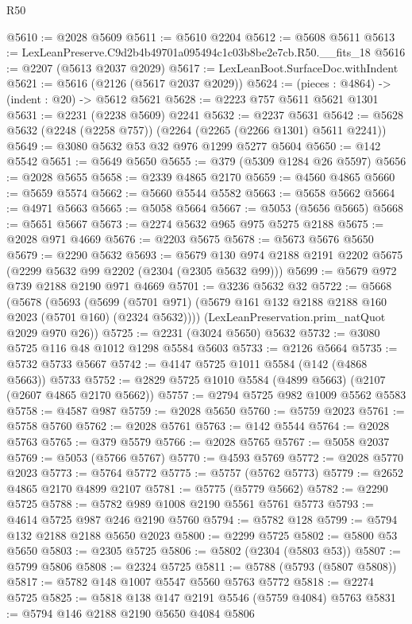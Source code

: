 \begin{lexlean}{R50}
\begin{coremodule}
@5610 := @2028 @5609
@5611 := @5610 @2204
@5612 := @5608 @5611
@5613 := LexLeanPreserve.C9d2b4b49701a095494c1c03b8be2e7cb.R50.__fits_18
@5616 := @2207 (@5613 @2037 @2029)
@5617 := LexLeanBoot.SurfaceDoc.withIndent
@5621 := @5616 (@2126 (@5617 @2037 @2029))
@5624 := (pieces : @4864) -> (indent : @20) -> @5612 @5621
@5628 := @2223 @757 @5611 @5621 @1301
@5631 := @2231 (@2238 @5609) @2241
@5632 := @2237 @5631
@5642 := @5628 @5632 (@2248 (@2258 @757)) (@2264 (@2265 (@2266 @1301) @5611 @2241))
@5649 := @3080 @5632 @53 @32 @976 @1299 @5277 @5604
@5650 := @142 @5542
@5651 := @5649 @5650
@5655 := @379 (@5309 @1284 @26 @5597)
@5656 := @2028 @5655
@5658 := @2339 @4865 @2170
@5659 := @4560 @4865
@5660 := @5659 @5574
@5662 := @5660 @5544 @5582
@5663 := @5658 @5662
@5664 := @4971 @5663
@5665 := @5058 @5664
@5667 := @5053 (@5656 @5665)
@5668 := @5651 @5667
@5673 := @2274 @5632 @965 @975 @5275 @2188
@5675 := @2028 @971 @4669
@5676 := @2203 @5675
@5678 := @5673 @5676 @5650
@5679 := @2290 @5632
@5693 := @5679 @130 @974 @2188 @2191 @2202 @5675 (@2299 @5632 @99 @2202 (@2304 (@2305 @5632 @99)))
@5699 := @5679 @972 @739 @2188 @2190 @971 @4669
@5701 := @3236 @5632 @32
@5722 := @5668
    (@5678
      (@5693
        (@5699 (@5701 @971) (@5679 @161 @132 @2188 @2188 @160 @2023 (@5701 @160) (@2324 @5632))))
      (LexLeanPreservation.prim_natQuot @2029 @970 @26))
@5725 := @2231 (@3024 @5650) @5632
@5732 := @3080 @5725 @116 @48 @1012 @1298 @5584 @5603
@5733 := @2126 @5664
@5735 := @5732 @5733 @5667
@5742 := @4147 @5725 @1011 @5584 (@142 (@4868 @5663)) @5733
@5752 := @2829 @5725 @1010 @5584 (@4899 @5663) (@2107 (@2607 @4865 @2170 @5662))
@5757 := @2794 @5725 @982 @1009 @5562 @5583
@5758 := @4587 @987
@5759 := @2028 @5650
@5760 := @5759 @2023
@5761 := @5758 @5760
@5762 := @2028 @5761
@5763 := @142 @5544
@5764 := @2028 @5763
@5765 := @379 @5579
@5766 := @2028 @5765
@5767 := @5058 @2037
@5769 := @5053 (@5766 @5767)
@5770 := @4593 @5769
@5772 := @2028 @5770 @2023
@5773 := @5764 @5772
@5775 := @5757 (@5762 @5773)
@5779 := @2652 @4865 @2170 @4899 @2107
@5781 := @5775 (@5779 @5662)
@5782 := @2290 @5725
@5788 := @5782 @989 @1008 @2190 @5561 @5761 @5773
@5793 := @4614 @5725 @987 @246 @2190 @5760
@5794 := @5782 @128
@5799 := @5794 @132 @2188 @2188 @5650 @2023
@5800 := @2299 @5725
@5802 := @5800 @53 @5650
@5803 := @2305 @5725
@5806 := @5802 (@2304 (@5803 @53))
@5807 := @5799 @5806
@5808 := @2324 @5725
@5811 := @5788 (@5793 (@5807 @5808))
@5817 := @5782 @148 @1007 @5547 @5560 @5763 @5772
@5818 := @2274 @5725
@5825 := @5818 @138 @147 @2191 @5546 (@5759 @4084) @5763
@5831 := @5794 @146 @2188 @2190 @5650 @4084 @5806

\end{coremodule}
\end{lexlean}
